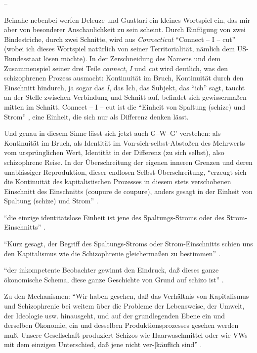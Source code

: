 \documentclass[12pt,
               DIV13,
               paper=a4,
               twoside=false,
               onehalfspacing,
               bibliography=totoc,
               toc=graduated,
               draft,
               ]{scrartcl}
\newcommand{\pc}[2]{\parencite[#1]{#2}}
\newcommand{\gwg}{G--W--G'\xspace}
\begin{document}
--

Beinahe nebenbei werfen Deleuze und Guattari ein kleines Wortspiel
ein, das mir aber von besonderer Anschaulichkeit zu sein scheint.
Durch Einfügung von zwei Bindestriche, durch zwei Schnitte, wird aus
\emph{Connecticut} "`Connect -- I -- cut"' \pc{48}{ao} (wobei ich
dieses Wortspiel natürlich von seiner Territorialität, nämlich dem
US-Bundesstaat lösen möchte). In der Zerschneidung des
Namens und dem Zusammenspiel seiner drei Teile \emph{connect},
\emph{I} und \emph{cut} wird deutlich, was den schizophrenen Prozess
ausmacht: Kontinuität im Bruch, Kontinuität durch den Einschnitt
hindurch, ja sogar das \emph{I}, das Ich, das Subjekt, das "`ich"'
sagt, taucht an der Stelle zwischen Verbindung und Schnitt auf,
befindet sich gewissermaßen mitten im Schnitt. Connect -- I -- cut ist
die "`Einheit von Spaltung (schize) und Strom"' \pc{296}{ao}, eine
Einheit, die sich nur als Differenz denken lässt.

Und genau in diesem Sinne lässt sich jetzt auch \gwg verstehen: als
Kontinuität im Bruch, als Identität im Von-sich-selbst-Abstoßen des
Mehrwerts vom ursprünglichen Wert, Identität in der Differenz (zu sich
selbst), also schizophrene Reise. In der Überschreitung der eigenen
inneren Grenzen und deren unablässiger Reproduktion, dieser endlosen
Selbst-Ü\-ber\-schrei\-tung, "`erzeugt sich die Kontinuität des
kapitalistischen Prozesses in diesem stets verschobenen Einschnitt des
Einschnitts (coupure de coupure), anders gesagt in der Einheit von
Spaltung (schize) und Strom"' \pc{296}{ao}.

"`die einzige identitätslose Einheit ist jene des Spaltungs-Stroms
oder des Strom-Einschnitts"' \pc{314}{ao}.

"`Kurz gesagt, der Begriff des Spaltungs-Stroms oder Strom-Einschnitts
schien uns den Kapitalismus wie die Schizophrenie gleichermaßen zu
bestimmen"' \pc{317}{ao}.

"`der inkompetente Beobachter gewinnt den Eindruck, daß dieses ganze
ökonomische Schema, diese ganze Geschichte von Grund auf schizo ist"'
\pc{306}{ao}.

Zu den Mechanismen: "`Wir haben gesehen, daß das Verhältnis von
Kapitalismus und Schizophrenie bei weitem über die Probleme der
Lebensweise, der Umwelt, der Ideologie usw. hinausgeht, und auf der
grundlegenden Ebene ein und derselben Ökonomie, ein und desselben
Produktionsprozesses gesehen werden muß. Unsere Gesellschaft
produziert Schizos wie Haarwaschmittel oder wie VWs mit dem einzigen
Unterschied, daß jene nicht ver-|käuflich sind"' \pc{S. 315 f.}{ao}.
\end{document}
